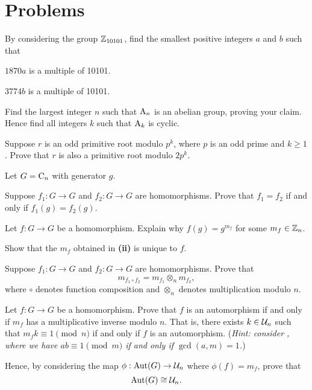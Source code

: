 \newpage

\section{Problems}
\begin{problem}
    By considering the group $\mathbb{Z}_{10101}$, find the smallest positive integers $a$ and $b$ such that
    \begin{partquestions}{\alph*}
        \item $1870a$ is a multiple of 10101.
        \item $3774b$ is a multiple of 10101.
    \end{partquestions}
\end{problem}

\begin{problem}
    Find the largest integer $n$ such that $\mathrm{A}_{n}$ is an abelian group, proving your claim. Hence find all integers $k$ such that $\mathrm{A}_{k}$ is cyclic.
\end{problem}

\begin{problem}
    Suppose $r$ is an odd primitive root modulo $p^k$, where $p$ is an odd prime and $k \geq 1$. Prove that $r$ is also a primitive root modulo $2p^k$.
\end{problem}

\begin{problem}
    Let $G = \mathrm{C}_{n}$ with generator $g$.
    \begin{partquestions}{\roman*}
        \item Suppose $f_1: G \to G$ and $f_2: G \to G$ are homomorphisms. Prove that $f_1 = f_2$ if and only if $f_1(g) = f_2(g)$.

        \item Let $f: G \to G$ be a homomorphism. Explain why $f(g) = g^{m_f}$ for some $m_f \in \mathbb{Z}_n$.

        \item Show that the $m_f$ obtained in \textbf{(ii)} is unique to $f$.

        \item Suppose $f_1: G \to G$ and $f_2: G \to G$ are homomorphisms. Prove that
        \[
            m_{f_1\circ f_2} = m_{f_1} \otimes_n m_{f_2},
        \]
        where $\circ$ denotes function composition and $\otimes_n$ denotes multiplication modulo $n$.

        \item Let $f: G \to G$ be a homomorphism. Prove that $f$ is an automorphism if and only if $m_f$ has a multiplicative inverse modulo $n$. That is, there exists $k \in \mathcal{U}_{n}$ such that $m_fk \equiv 1 \pmod n$ if and only if $f$ is an automorphism.\newline
        (\textit{Hint: consider , where we have $ab \equiv 1 \pmod m$ if and only if $\gcd(a, m) = 1$.})

        \item Hence, by considering the map $\phi: \mathrm{Aut}(G) \to \mathcal{U}_{n}$ where $\phi(f) = m_f$, prove that
        \[
            \mathrm{Aut}(G) \cong \mathcal{U}_{n}.
        \]
    \end{partquestions}
\end{problem}
